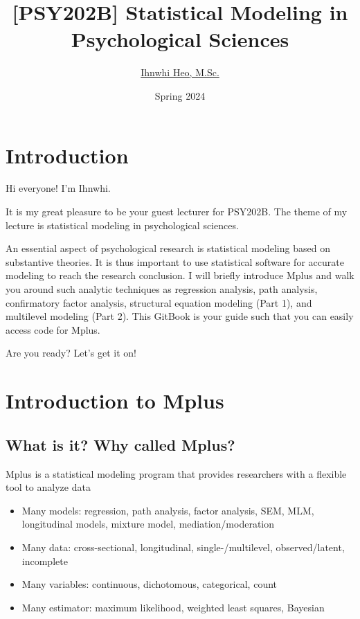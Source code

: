 \documentclass[
]{book}
\title{{[}PSY202B{]} Statistical Modeling in Psychological Sciences}
\author{\href{https://ihnwhiheo.github.io/}{Ihnwhi Heo, M.Sc.}}
\date{Spring 2024}
\begin{document}
\maketitle

{
\setcounter{tocdepth}{1}
\tableofcontents
}
\hypertarget{introduction}{%
\chapter{Introduction}\label{introduction}}

Hi everyone! I'm Ihnwhi.

It is my great pleasure to be your guest lecturer for PSY202B. The theme of my lecture is statistical modeling in psychological sciences.

An essential aspect of psychological research is statistical modeling based on substantive theories. It is thus important to use statistical software for accurate modeling to reach the research conclusion. I will briefly introduce Mplus and walk you around such analytic techniques as regression analysis, path analysis, confirmatory factor analysis, structural equation modeling (Part 1), and multilevel modeling (Part 2). This GitBook is your guide such that you can easily access code for Mplus.

Are you ready? Let's get it on!

\hypertarget{introduction-to-mplus}{%
\chapter{Introduction to Mplus}\label{introduction-to-mplus}}

\hypertarget{what-is-it-why-called-mplus}{%
\section{What is it? Why called Mplus?}\label{what-is-it-why-called-mplus}}

Mplus is a statistical modeling program that provides researchers with a flexible tool to analyze data

\begin{itemize}
\item
  Many models: regression, path analysis, factor analysis, SEM, MLM, longitudinal models, mixture model, mediation/moderation
\item
  Many data: cross-sectional, longitudinal, single-/multilevel, observed/latent, incomplete
\item
  Many variables: continuous, dichotomous, categorical, count
\item
  Many estimator: maximum likelihood, weighted least squares, Bayesian
\end{itemize}
\end{document}
